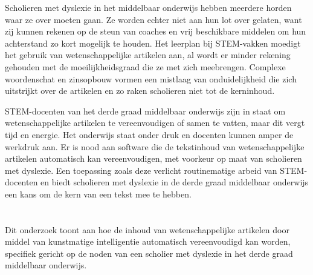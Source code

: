 
Scholieren met dyslexie in het middelbaar onderwijs hebben meerdere horden waar ze over moeten gaan. Ze worden echter niet aan hun lot over gelaten, want zij kunnen rekenen op de steun van coaches en vrij beschikbare middelen om hun achterstand zo kort mogelijk te houden. Het leerplan bij STEM-vakken moedigt het gebruik van wetenschappelijke artikelen aan, al wordt er minder rekening gehouden met de moeilijkheidsgraad die ze met zich meebrengen. Complexe woordenschat en zinsopbouw vormen een mistlaag van onduidelijkheid die zich uitstrijkt over de artikelen en zo raken scholieren niet tot de kerninhoud.


STEM-docenten van het derde graad middelbaar onderwijs zijn in staat om wetenschappelijke artikelen te vereenvoudigen of samen te vatten, maar dit vergt tijd en energie. Het onderwijs staat onder druk en docenten kunnen amper de werkdruk aan. Er is nood aan software die de tekstinhoud van wetenschappelijke artikelen automatisch kan vereenvoudigen, met voorkeur op maat van scholieren met dyslexie. Een toepassing zoals deze verlicht routinematige arbeid van STEM-docenten en biedt scholieren met dyslexie in de derde graad middelbaar onderwijs een kans om de kern van een tekst mee te hebben.


\section{}%
\label{sec:onderzoeksvraag}



Dit onderzoek toont aan hoe de inhoud van wetenschappelijke artikelen door middel van kunstmatige intelligentie automatisch vereenvoudigd kan worden, specifiek gericht op de noden van een scholier met dyslexie in het derde graad middelbaar onderwijs.

